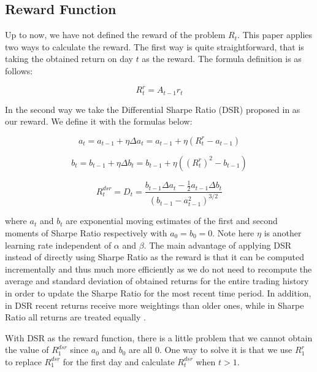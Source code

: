 \documentclass{article}
\begin{document}
\subsection{Reward Function} %

\noindent Up to now, we have not defined the reward of the problem $R_{t}$. This paper applies two ways to calculate the reward. The first way is quite straightforward, that is taking the obtained return on day $t$ as the reward. The formula definition is as follows:

\begin{equation}
	R_{t}^{r} = A_{t-1}r_{t}
\end{equation}

\indent In the second way we take the Differential Sharpe Ratio (DSR) proposed in \cite{moody1998performance} as our reward. We define it with the formulas below:

\begin{equation}
	a_{t} = a_{t-1} + \eta \Delta a_{t}= a_{t-1}+\eta \left ( R_{t}^{r}-a_{t-1} \right )
\end{equation}

\begin{equation}
	b_{t} = b_{t-1} + \eta \Delta b_{t}= b_{t-1}+\eta \left ( (R_{t}^{r})^{2}-b_{t-1} \right )
\end{equation}

\begin{equation}
	R_{t}^{dsr} = D_{t} = \frac{b_{t-1}\Delta a_{t}-\frac{1}{2}a_{t-1}\Delta b_{t}}{\left ( b_{t-1}-a_{t-1}^{2} \right )^{3/2}}
\end{equation}

\noindent where $a_{t}$ and $b_{t}$ are exponential moving estimates of the first and second moments of Sharpe Ratio respectively with $a_{0} = b_{0} = 0$. Note here $\eta$ is another learning rate independent of $\alpha$ and $\beta$. The main advantage of applying DSR instead of directly using Sharpe Ratio as the reward is that it can be computed incrementally and thus much more efficiently as we do not need to recompute the average and standard deviation of obtained returns for the entire trading history in order to update the Sharpe Ratio for the most recent time period. In addition, in DSR recent returns receive more weightings than older ones, while in Sharpe Ratio all returns are treated equally \cite{moody1998performance}.

\indent With DSR as the reward function, there is a little problem that we cannot obtain the value of $R_{1}^{dsr}$ since $a_{0}$ and $b_{0}$ are all 0. One way to solve it is that we use $R_{1}^{r}$ to replace $R_{1}^{dsr}$ for the first day and calculate $R_{t}^{dsr}$ when $t > 1$.
\end{document}
